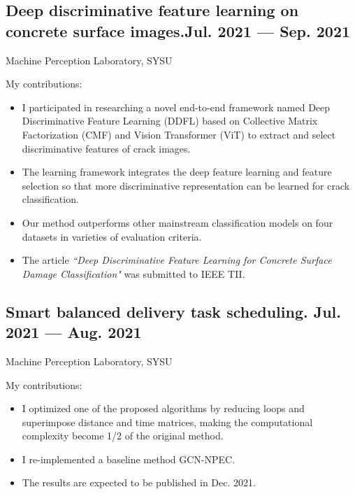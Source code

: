 \documentclass[a4,11pt]{article}
\newcommand{\subtext}[1]{
#1\par\vspace{-0.2cm}}
\begin{document}
\subsection*{Deep discriminative feature learning on concrete surface images.\hfill Jul. 2021 --- Sep. 2021} 
\subtext{Machine Perception Laboratory, SYSU } 
\vspace {6pt}
My contributions:
    \begin{itemize}[topsep = 0 pt, itemsep = 0 pt, parsep = 1 pt]
		\item I participated in researching a novel end-to-end framework named Deep Discriminative Feature Learning (DDFL) based on Collective Matrix Factorization (CMF) and Vision Transformer (ViT) to extract and select discriminative features of crack images. 
		\item The learning framework integrates the deep feature learning and feature selection so that more
discriminative representation can be learned for crack classification.
		\item  Our method outperforms other mainstream classification models on four datasets in varieties of evaluation criteria.
		\item The article  \textit{``Deep Discriminative Feature Learning for Concrete Surface Damage Classification"} was submitted to IEEE TII.
    \end{itemize}

\subsection*{Smart balanced delivery task scheduling. \hfill Jul. 2021 --- Aug. 2021} 
\subtext{Machine Perception Laboratory, SYSU } 
\vspace {6pt}
My contributions:
    \begin{itemize}[topsep = 0 pt, itemsep = 0 pt, parsep = 1 pt]
        \item I optimized one of the proposed algorithms by reducing loops and superimpose distance and time matrices, making the computational complexity become 1/2 of the original method. 
		\item I re-implemented a baseline method GCN-NPEC. 
		\item The results are expected to be published in Dec. 2021.
    \end{itemize}





\end{document}
